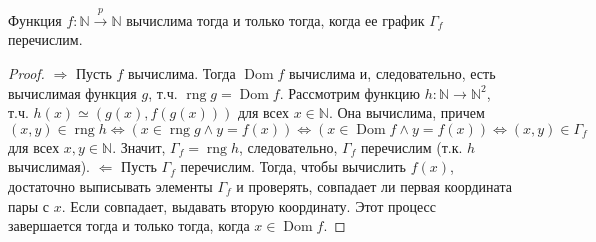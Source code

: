 \begin{theorem}
  Функция $f : \mathbb{N} \overset{p}{\to} \mathbb{N}$ вычислима тогда и только тогда, когда ее график $\Gamma_f$ перечислим.
  \begin{proof}
    $\Rightarrow$ \newline
    Пусть $f$ вычислима. Тогда $\operatorname{Dom} f$ вычислима и, следовательно, есть вычислимая функция $g$, т.ч. $\operatorname{rng} g = \operatorname{Dom} f$. Рассмотрим функцию $h : \mathbb{N} \to \mathbb{N}^2$, т.ч. $h(x) \simeq (g(x), f(g(x)))$ для всех $x \in \mathbb{N}$. Она вычислима, причем
    \[
      (x,y) \in \operatorname{rng} h \Leftrightarrow
      (x \in \operatorname{rng} g \wedge y = f(x)) \Leftrightarrow
      (x \in \operatorname{Dom} f \wedge y = f(x)) \Leftrightarrow
      (x,y) \in \Gamma_f
    \]
    для всех $x,y \in \mathbb{N}$. Значит, $\Gamma_f = \operatorname{rng} h$, следовательно, $\Gamma_f$ перечислим (т.к. $h$ вычислимая). \newline
    $\Leftarrow$ \newline
    Пусть $\Gamma_f$ перечислим. Тогда, чтобы вычислить $f(x)$, достаточно выписывать элементы $\Gamma_f$ и проверять, совпадает ли первая координата пары с $x$. Если совпадает, выдавать вторую координату. Этот процесс завершается тогда и только тогда, когда $x \in \operatorname{Dom} f$.
  \end{proof}
\end{theorem}